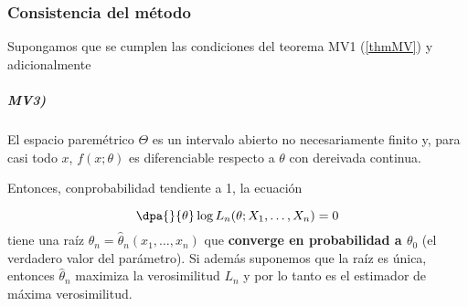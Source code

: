 \documentclass{apuntes}
\begin{document}
\subsubsection{Consistencia del método}

\begin{theorem}[Teorema MV2]\label{thmMV2} Supongamos que se cumplen las condiciones del teorema MV1 (\ref{thmMV}) y adicionalmente

\subparagraph{MV3)} El espacio paremétrico $\Theta$ es un intervalo abierto no necesariamente finito y, para casi todo $x$, $f(x;\theta)$ es diferenciable respecto a $\theta$ con dereivada continua.

Entonces, conprobabilidad tendiente a 1, la ecuación

\begin{equation}
 \dpa{}{\theta} \log L_n (\theta;X_1,\dotsc,X_n) = 0 \label{eqMV2}
\end{equation}
tiene una raíz $\hat\theta_n = \hat\theta_n(x_1,\dotsc,x_n)$ que \textbf{converge en probabilidad a $\theta_0$} (el verdadero valor del parámetro). Si además suponemos que la raíz es única, entonces $\hat\theta_n$ maximiza la verosimilitud $L_n$ y por lo tanto es el estimador de máxima verosimilitud.
\end{theorem}
\end{document}
